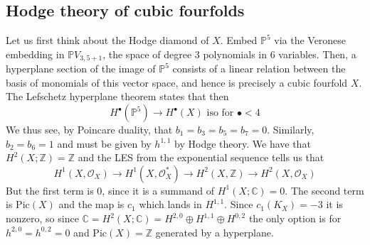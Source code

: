 





\subsection{Hodge theory of cubic fourfolds}

Let us first think about the Hodge diamond of $X$. Embed $\mathbb{P}^5$ via the Veronese embedding in $\mathbb{P}V_{3,5+1}$, the space of degree 3 polynomials in 6 variables. Then, a hyperplane section of the image of $\mathbb{P}^5$ consists of a linear relation between the basis of monomials of this vector space, and hence is precisely a cubic fourfold $X$. The Lefschetz hyperplane theorem states that then $$H^\bullet(\mathbb{P}^5)\xrightarrow{}H^\bullet (X) \text{ iso for }\bullet<4$$
We thus see, by Poincare duality, that $b_{1}=b_{3}=b_{5}=b_{7}=0$. Similarly, $b_{2}=b_{6}=1$ and must be given by $h^{1,1}$ by Hodge theory. We have that $H^2(X;\mathbb{Z})=\mathbb{Z}$ and the LES from the exponential sequence tells us that $$H^1(X,\mathcal{O}_{X})\xrightarrow{}H^1(X,\mathcal{O}_{X}^*)\xrightarrow{}H^2(X,\mathbb{Z})\xrightarrow{}H^2(X,\mathcal{O}_{X})$$
But the first term is 0, since it is a summand of $H^1(X;\mathbb{C})=0$. The second term is $\mathrm{Pic}(X)$ and the map is $c_1$ which lands in $H^{1,1}$. Since $c_1(K_X)=-3$ it is nonzero, so since $\mathbb{C}=H^2(X;\mathbb{C})=H^{2,0}\oplus H^{1,1}\oplus H^{0,2}$ the only option is for $h^{2,0}=h^{0,2}=0$ and $\mathrm{Pic}(X)=\mathbb{Z}$ generated by a hyperplane. 

